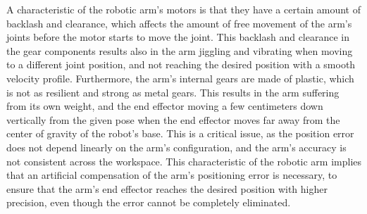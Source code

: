 A characteristic of the robotic arm's motors is that they have a certain amount of backlash and clearance,
which affects the amount of free movement of the arm's joints before the motor starts to move the joint.
This backlash and clearance in the gear components results also in the arm jiggling and vibrating when moving to a
different joint position, and not reaching the desired position with a smooth velocity profile.
Furthermore, the arm's internal gears are made of plastic, which is not as resilient and strong as metal gears.
This results in the arm suffering from its own weight, and the end effector moving a few centimeters down vertically from
the given pose when the end effector moves far away from the center of gravity of the robot's base. This is a critical
issue, as the position error does not depend linearly on the arm's configuration, and the arm's accuracy is not consistent
across the workspace. This characteristic of the robotic arm implies that an artificial compensation of the arm's
positioning error is necessary, to ensure that the arm's end effector reaches the desired position with higher precision,
even though the error cannot be completely eliminated.



